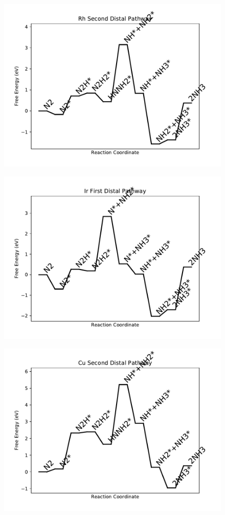 \begin{figure}
\centering
\includegraphics[width=0.8\linewidth]{data/plots/Rh_distal_2.pdf}
\end{figure}

\begin{figure}
\centering
\includegraphics[width=0.8\linewidth]{data/plots/Ir_distal_1.pdf}
\end{figure}

\begin{figure}
\centering
\includegraphics[width=0.8\linewidth]{data/plots/Cu_distal_2.pdf}
\end{figure}

